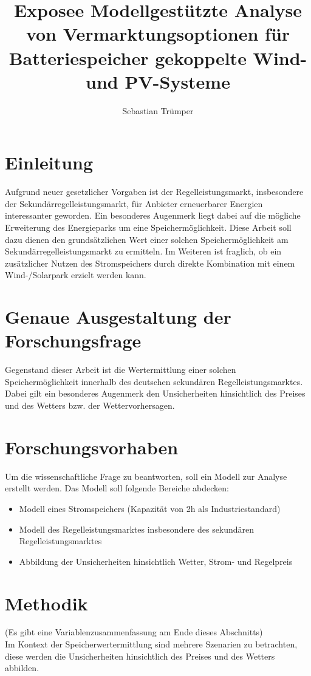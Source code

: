 \documentclass[british,         %
BCOR=2mm,                       %
11pt,                           %
a4paper,						%
oneside,						%
cdgeometry,                     %
toc=chapterentrydotfill,        %
toc=indent,                     %
bibliography=totoc,         	%
listof=totoc,                   %
numbers=noenddot,				%
parskip=full,                   %
cdmath=false					%
]{article}                  %
\title{Exposee Modellgestützte Analyse von Vermarktungsoptionen für Batteriespeicher gekoppelte Wind- und PV-Systeme}
\author{Sebastian Trümper}
\date{ }
\begin{document}

\maketitle

\tableofcontents


\section{Einleitung}
Aufgrund neuer gesetzlicher Vorgaben ist der Regelleistungsmarkt, 
insbesondere der Sekundärregelleistungsmarkt, 
für Anbieter erneuerbarer Energien interessanter geworden. Ein besonderes Augenmerk liegt dabei auf die mögliche Erweiterung des Energieparks 
um eine Speichermöglichkeit. Diese Arbeit soll dazu dienen den grundsätzlichen Wert einer solchen Speichermöglichkeit
am Sekundärregelleistungsmarkt zu ermitteln.
Im Weiteren ist fraglich, ob ein zusätzlicher Nutzen des Stromspeichers durch direkte Kombination mit einem 
Wind-/Solarpark erzielt werden kann.


\section{Genaue Ausgestaltung der Forschungsfrage}
Gegenstand dieser Arbeit ist die Wertermittlung einer solchen Speichermöglichkeit innerhalb des deutschen sekundären Regelleistungsmarktes. 
Dabei gilt ein besonderes Augenmerk den Unsicherheiten hinsichtlich des Preises und des Wetters bzw. der Wettervorhersagen.


\section{Forschungsvorhaben}
Um die wissenschaftliche Frage zu beantworten, soll ein Modell zur Analyse erstellt werden. 
Das Modell soll folgende Bereiche abdecken: 
\begin{itemize}
	\item Modell eines Stromspeichers (Kapazität von 2h als Industriestandard)
	\item Modell des Regelleistungsmarktes insbesondere des sekundären Regelleistungsmarktes
	\item Abbildung der Unsicherheiten hinsichtlich Wetter, Strom- und Regelpreis
\end{itemize}



\section{Methodik}
(Es gibt eine Variablenzusammenfassung am Ende dieses Abschnitts)\\
Im Kontext der Speicherwertermittlung sind mehrere Szenarien zu betrachten, 
diese werden die Unsicherheiten hinsichtlich des Preises und des Wetters abbilden.
\end{document}
